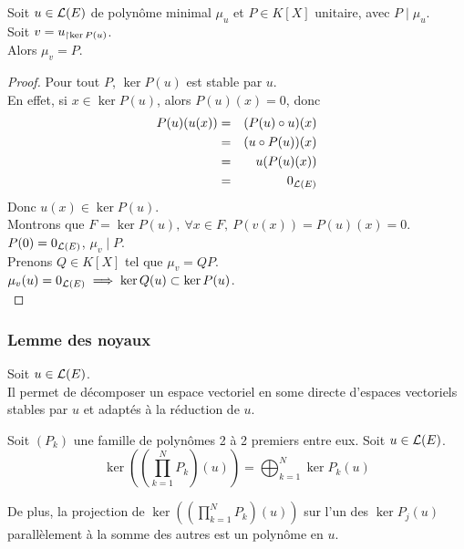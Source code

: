 \begin{coro}
	Soit $u \in \mathcal{L}(E)$ de polynôme minimal $\mu_u$ et $P \in K[X]$ unitaire, avec $P \mid \mu_u$.\\
	Soit $v = u_{\restriction \ker P(u)}$.\\
	Alors $\mu_v = P$.
\end{coro}


\begin{proof}
	Pour tout $P$, $\ker P(u) $ est stable par $u$.\\
	En effet, si $x \in \ker P(u)$, alors $P(u)(x) = 0$, donc
	\begin{eqnarray*}
		P(u)(u(x)) &=& (P (u) \circ u)(x) \\
		&=& (u \circ P(u))(x) \\
		&=& u(P(u)(x)) \\
		&=& 0_{\mathcal{L}(E)}
	\end{eqnarray*}
	Donc $u(x) \in \ker P(u)$.\\ %

	Montrons que $F = \ker P(u), \ \forall x \in F, \ P(v(x)) = P(u)(x) = 0$.\\

	$P(0)=0_{\mathcal{L}(E)}$, $\mu_v \mid P$.\\
	Prenons $Q \in K[X]$ tel que $\mu_v = QP$.\\
	$\mu_v(u) = 0_{\mathcal{L}(E)} \implies \ker Q(u) \subset \ker P(u)$.\\
\end{proof}



\subsubsection{Lemme des noyaux}

Soit $u \in \mathcal{L}(E)$.\\
Il permet de décomposer un espace vectoriel en some directe d'espaces vectoriels stables par $u$ et adaptés à la réduction de $u$.

\begin{lemma}
	Soit $(P_k)$ une famille de polynômes 2 à 2 premiers entre eux.
	Soit $u \in \mathcal{L}(E)$.
	$$ \ker \left(\left(\prod_{k=1}^N P_k \right)(u)\right) = \bigoplus_{k=1}^N \ker P_k(u)$$

	De plus, la projection de $\ker \left(\left(\prod\limits_{k=1}^N P_k \right)(u)\right)$ sur l'un des  $\ker P_j(u)$ parallèlement à la somme des autres est un polynôme en $u$.
\end{lemma}

